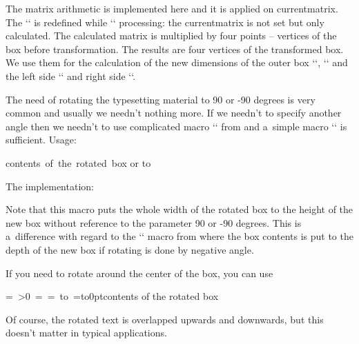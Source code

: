The matrix arithmetic is implemented here and it is applied on currentmatrix. The `\pdfsetmatrix` is redefined while `\pretransform` processing: the currentmatrix is not set but only calculated. The calculated matrix is multiplied by four points -- vertices of the box before transformation. The results are four vertices of the transformed box. We use them for the calculation of the new dimensions of the outer box `\newHt`, `\newDp` and the left side `\newLt` and right side `\newRt`. 


 


The need of rotating the typesetting material to 90 or -90 degrees is very common and usually we needn't nothing more. If we needn't to specify another angle then we needn't to use complicated macro `\rotbox` from  and a~simple macro `\rotsimple` is sufficient. Usage: 

\begtt
{}\hbox{contents of the rotated box} 
or 
\vbox to 
\endtt


The implementation: 

\begtt
\def\rotsimple#1{\hbox\bgroup\def\tmpb{#1}\afterassignment\rotsimpleA \setbox0=}%
\def\rotsimpleA{\aftergroup\rotsimpleB} 
\def\rotsimpleB{\setbox0=\hbox{\box0}%
   \ifnum\tmpb>0 \kern\ht0 \tmpdim=\dp0 \else \kern\dp0 \tmpdim=\ht0 \fi 
   \vbox to\wd0{\ifnum\tmpb>0 \vfill\fi 
                \wd0=0pt \dp0=0pt \ht0=0pt 
                \pdfsave\pdfrotate{\tmpb}\box0 \pdfrestore 
                \vfil}%
   \kern\tmpdim 
   \egroup} 
\endtt


Note that this macro puts the whole width of the rotated box to the height of the new box without reference to the parameter 90 or -90 degrees. This is a~difference with regard to the `\rotbox` macro from  where the box contents is put to the depth of the new box if rotating is done by negative angle. 



If you need to rotate around the center of the box, you can use 

\begtt
\rotsimple{90}\hbox to0pt{\hss contents of the rotated box\hss} 
\endtt


Of course, the rotated text is overlapped upwards and downwards, but this doesn't matter in typical applications. 


 


